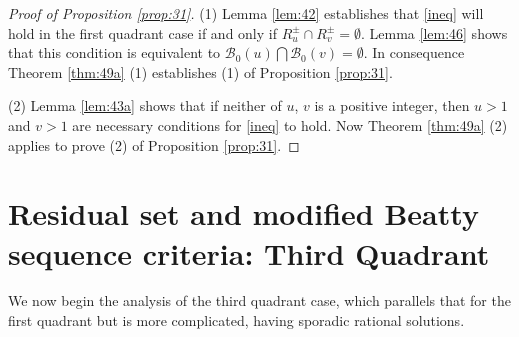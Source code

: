 \documentclass[12pt,letterpaper, reqno]{amsart}
\theoremstyle{definition}
\theoremstyle{remark}
\newcommand{\sB}{{\mathcal B}}
\begin{document}
\begin{proof}[Proof of Proposition \ref{prop:31}]
(1)  Lemma \ref{lem:42} establishes that \eqref{ineq} will hold  in the first quadrant case  if and only if $R_u^{\pm} \cap R_v^{\pm} = \emptyset$.
 Lemma \ref{lem:46} shows that this condition is equivalent to $\sB_0(u) \bigcap \sB_0(v) = \emptyset$.
In consequence  Theorem \ref{thm:49a} (1)   establishes (1) of Proposition \ref{prop:31}.

(2)  Lemma \ref{lem:43a} shows that if neither of $u$, $v$ is a positive integer,
then $u>1$ and $v>1$ are necessary conditions for \eqref{ineq} to hold. 
Now Theorem \ref{thm:49a} (2) applies to prove  (2) of Proposition \ref{prop:31}.
\end{proof}


 
 
 
 
 
 
 
 
%
%

\section{Residual set and modified Beatty sequence criteria: Third Quadrant} \label{sec:5}
\setcounter{equation}{0}

We now begin the analysis of  the third quadrant case, which parallels that for the first quadrant
but is more complicated, having sporadic rational solutions.
\end{document}
